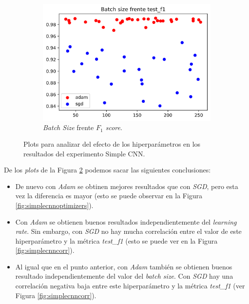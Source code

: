 \begin{figure}[H]
\begin{subfigure}[b]{.5\textwidth}
  \centering
  \includegraphics[width=.8\linewidth]{imagenes/06_Experimentacion/simplecnn/simplecnnbs.png}
  \caption{\textit{Batch Size} frente \textit{$F_1$ score}.}
  \label{fig:simplecnnreg}
\end{subfigure}

\caption{Plots para analizar del efecto de los hiperparámetros en los resultados del experimento Simple CNN.}
\label{fig:simplecnnanalysis}
\end{figure}

De los \textit{plots} de la Figura \ref{fig:simplecnnanalysis} podemos sacar las siguientes conclusiones:

\begin{itemize}
    \item De nuevo con \textit{Adam} se obtinen mejores resultados que con \textit{SGD}, pero esta vez la diferencia es mayor (esto se puede observar en la Figura \ref{fig:simplecnnoptimizers}).

    \item Con \textit{Adam} se obtienen buenos resultados independientemente del \textit{learning rate}. Sin embargo, con \textit{SGD} no hay mucha correlación entre el valor de este hiperparámetro y la métrica \textit{test\_f1} (esto se puede ver en la Figura \ref{fig:simplecnncorr}).
    
    \item Al igual que en el punto anterior, con \textit{Adam} también se obtienen buenos resultado independientemente del valor del \textit{batch size}. Con \textit{SGD} hay una correlación negativa baja entre este hiperparámetro y la métrica \textit{test\_f1} (ver Figura \ref{fig:simplecnncorr}).
\end{itemize}

